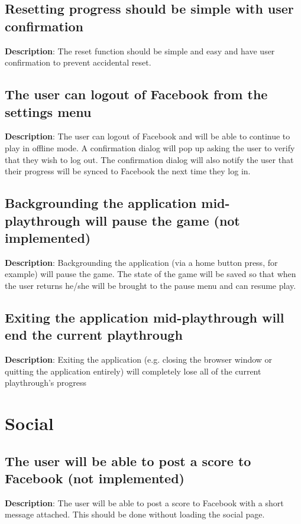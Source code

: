 \subsection{Resetting progress should be simple with user confirmation}
\textbf{Description}: The reset function should be simple and easy
and have user confirmation to prevent accidental reset.

\subsection{The user can logout of Facebook from the settings menu}
\textbf{Description}: The user can logout of Facebook and will be
able to continue to play in offline mode. A confirmation dialog will
pop up asking the user to verify that they wish to log out. The confirmation
dialog will also notify the user that their progress will be synced
to Facebook the next time they log in.

\subsection{Backgrounding the application mid-playthrough will pause
the game (not implemented)}
\textbf{Description}: Backgrounding the application (via a home button
press, for example) will pause the game. The state of the game will
be saved so that when the user returns he/she will be brought to the
pause menu and can resume play.

\subsection{Exiting the application mid-playthrough will end the current playthrough}
\textbf{Description}: Exiting the application (e.g. closing the browser
window or quitting the application entirely) will completely lose
all of the current playthrough\textquoteright{}s progress

\section{Social}
\renewcommand\thesubsection{SOC-%
\ifnum\value{subsection}<10 0\fi
\arabic{subsection}}
\subsection{The user will be able to post a score to Facebook (not implemented)}
\textbf{Description}: The user will be able to post a score to Facebook
with a short message attached. This should be done without loading
the social page.

